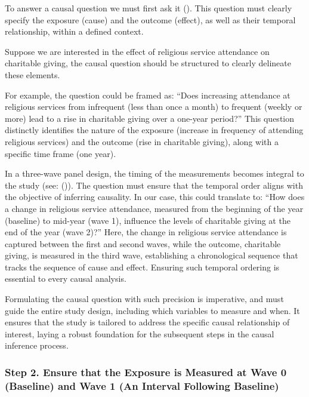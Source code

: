 \documentclass[
  singlecolumn,
  9pt]{article}
\begin{document}
To answer a causal question we must first ask it
(). This question
must clearly specify the exposure (cause) and the outcome (effect), as
well as their temporal relationship, within a defined context.

Suppose we are interested in the effect of religious service attendance
on charitable giving, the causal question should be structured to
clearly delineate these elements.

For example, the question could be framed as: ``Does increasing
attendance at religious services from infrequent (less than once a
month) to frequent (weekly or more) lead to a rise in charitable giving
over a one-year period?'' This question distinctly identifies the nature
of the exposure (increase in frequency of attending religious services)
and the outcome (rise in charitable giving), along with a specific time
frame (one year).

In a three-wave panel design, the timing of the measurements becomes
integral to the study (see: ()). The question must ensure that the temporal order
aligns with the objective of inferring causality. In our case, this
could translate to: ``How does a change in religious service attendance,
measured from the beginning of the year (baseline) to mid-year (wave 1),
influence the levels of charitable giving at the end of the year (wave
2)?'' Here, the change in religious service attendance is captured
between the first and second waves, while the outcome, charitable
giving, is measured in the third wave, establishing a chronological
sequence that tracks the sequence of cause and effect. Ensuring such
temporal ordering is essential to every causal analysis.

Formulating the causal question with such precision is imperative, and
must guide the entire study design, including which variables to measure
and when. It ensures that the study is tailored to address the specific
causal relationship of interest, laying a robust foundation for the
subsequent steps in the causal inference process.

\subsubsection{Step 2. Ensure that the Exposure is Measured at Wave 0
(Baseline) and Wave 1 (An Interval Following
Baseline)}\label{step-2.-ensure-that-the-exposure-is-measured-at-wave-0-baseline-and-wave-1-an-interval-following-baseline}
\end{document}
